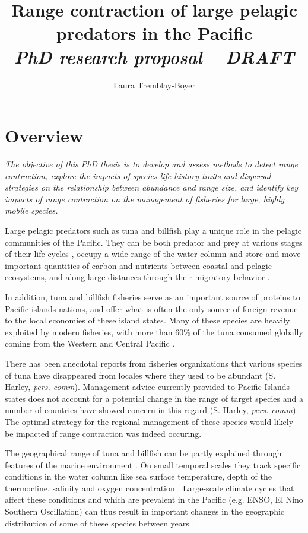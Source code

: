 \documentclass{article}
\title{Range contraction of large pelagic predators in the Pacific \\
  \emph{\large PhD research proposal -- DRAFT}}
\author{Laura Tremblay-Boyer}
\begin{document}
\maketitle

\section*{Overview}

\emph{The objective of this PhD thesis is to develop and assess methods to detect
range contraction, explore the impacts of species life-history traits
and dispersal strategies on the relationship between abundance and
range size, and identify key impacts of range contraction on the
 management of fisheries for large, highly mobile species.}

Large pelagic predators such as tuna and billfish play a unique role
in the pelagic communities of the Pacific. They can be both predator
and prey at various stages of their life cycles \citep{Young2010_a,
  Cox2002_a, Hinke2004_a}, occupy a wide range of the water column
\citep{Schaefer2009_a} and store and move important quantities of
carbon and nutrients between coastal and pelagic ecosystems, and along
large distances through their migratory behavior
\citep{Allain2012_a}.

In addition, tuna and billfish fisheries serve as an important source
of proteins to Pacific islands nations, and offer what is often the
only source of foreign revenue to the local economies of these island
states. Many of these species are heavily exploited by modern
fisheries, with more than 60\% of the tuna consumed globally
coming from the Western and Central Pacific \citep{Williams2012_a}.

There has been anecdotal reports from fisheries organizations that
various species of tuna have disappeared from locales where they used
to be abundant (S. Harley, \emph{pers. comm}). Management advice
currently provided to Pacific Islands states does not account for a
potential change in the range of target species and a number of
countries have showed concern in this regard (S. Harley,
\emph{pers. comm}). The optimal strategy for the regional management of
these species would likely be impacted if range contraction was
indeed occuring.

The geographical range of tuna and billfish can be partly explained
through features of the marine environment
\citep[e.g.][]{Reygondeau2012_a}. On small temporal scales they
track specific conditions in the water column like sea surface
temperature, depth of the thermocline, salinity and oxygen
concentration \citep[e.g.][]{Fiedler1987_a, Reese2011_a}. Large-scale
climate cycles that affect these conditions and which are prevalent in
the Pacific (e.g. ENSO, El Nino Southern Oscillation) can thus result
in important changes in the geographic distribution of some of these
species between years \citep{Lehodey1997_a}.
\end{document}
